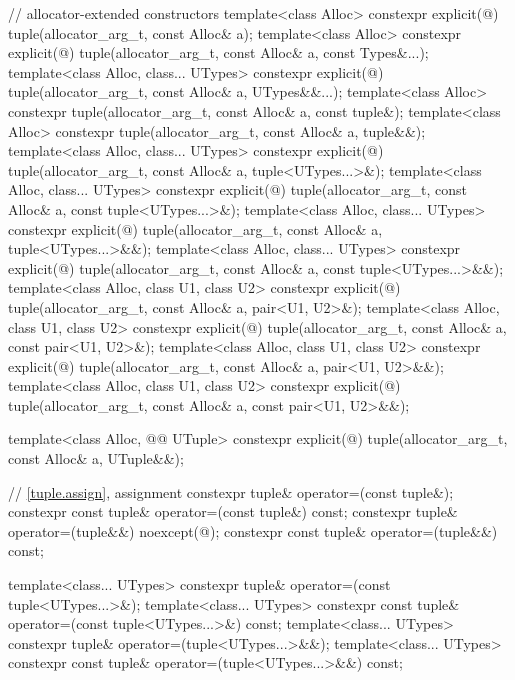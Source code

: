 \begin{codeblock}
{{    // allocator-extended constructors
    template<class Alloc>
      constexpr explicit(@\seebelow@)
        tuple(allocator_arg_t, const Alloc& a);
    template<class Alloc>
      constexpr explicit(@\seebelow@)
        tuple(allocator_arg_t, const Alloc& a, const Types&...);
    template<class Alloc, class... UTypes>
      constexpr explicit(@\seebelow@)
        tuple(allocator_arg_t, const Alloc& a, UTypes&&...);
    template<class Alloc>
      constexpr tuple(allocator_arg_t, const Alloc& a, const tuple&);
    template<class Alloc>
      constexpr tuple(allocator_arg_t, const Alloc& a, tuple&&);
    template<class Alloc, class... UTypes>
      constexpr explicit(@\seebelow@)
        tuple(allocator_arg_t, const Alloc& a, tuple<UTypes...>&);
    template<class Alloc, class... UTypes>
      constexpr explicit(@\seebelow@)
        tuple(allocator_arg_t, const Alloc& a, const tuple<UTypes...>&);
    template<class Alloc, class... UTypes>
      constexpr explicit(@\seebelow@)
        tuple(allocator_arg_t, const Alloc& a, tuple<UTypes...>&&);
    template<class Alloc, class... UTypes>
      constexpr explicit(@\seebelow@)
        tuple(allocator_arg_t, const Alloc& a, const tuple<UTypes...>&&);
    template<class Alloc, class U1, class U2>
      constexpr explicit(@\seebelow@)
        tuple(allocator_arg_t, const Alloc& a, pair<U1, U2>&);
    template<class Alloc, class U1, class U2>
      constexpr explicit(@\seebelow@)
        tuple(allocator_arg_t, const Alloc& a, const pair<U1, U2>&);
    template<class Alloc, class U1, class U2>
      constexpr explicit(@\seebelow@)
        tuple(allocator_arg_t, const Alloc& a, pair<U1, U2>&&);
    template<class Alloc, class U1, class U2>
      constexpr explicit(@\seebelow@)
        tuple(allocator_arg_t, const Alloc& a, const pair<U1, U2>&&);

    template<class Alloc, @@ UTuple>
      constexpr explicit(@\seebelow@) tuple(allocator_arg_t, const Alloc& a, UTuple&&);

    // \ref{tuple.assign},  assignment
    constexpr tuple& operator=(const tuple&);
    constexpr const tuple& operator=(const tuple&) const;
    constexpr tuple& operator=(tuple&&) noexcept(@\seebelow@);
    constexpr const tuple& operator=(tuple&&) const;

    template<class... UTypes>
      constexpr tuple& operator=(const tuple<UTypes...>&);
    template<class... UTypes>
      constexpr const tuple& operator=(const tuple<UTypes...>&) const;
    template<class... UTypes>
      constexpr tuple& operator=(tuple<UTypes...>&&);
    template<class... UTypes>
      constexpr const tuple& operator=(tuple<UTypes...>&&) const;

}}
\end{codeblock}
